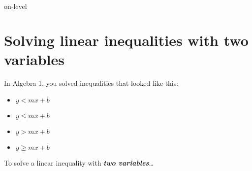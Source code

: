 \begin{taggedblock}{on-level}

\section*{Solving linear inequalities with two variables}

In Algebra 1, 
you solved inequalities that looked like this:

\begin{center}
\begin{minipage}{0.4\textwidth}
    \begin{itemize}[itemsep=0in]
        \item $y <    mx + b$
        \item $y \leq mx + b$
    \end{itemize}
\end{minipage}
\begin{minipage}{0.4\textwidth}
    \begin{itemize}[itemsep=0in]
        \item $y >    mx + b$
        \item $y \geq mx + b$
    \end{itemize}
\end{minipage}
\end{center}


\begin{myConceptSteps}{
    To solve a linear inequality with {\bfseries\itshape two variables}\dots
}
\end{myConceptSteps}



\end{taggedblock}
            